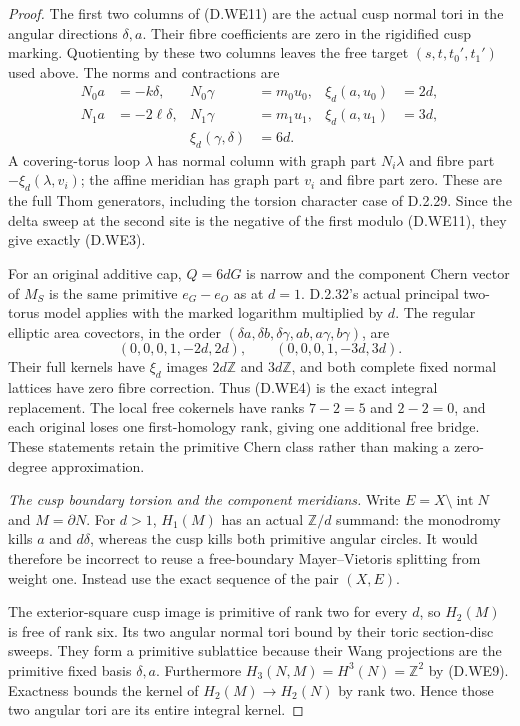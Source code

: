 \begin{proof}
The first two columns of (D.WE11) are the actual
cusp normal tori in the angular directions
$\delta,a$. Their fibre coefficients are zero in
the rigidified cusp marking. Quotienting by these
two columns leaves the free target
$(s,t,t_0',t_1')$ used above.
The norms and contractions are
\[
\begin{aligned}
 N_0a&=-k\delta,&N_0\gamma&=m_0u_0,&
 \xi_d(a,u_0)&=2d,\\
 N_1a&=-2\ell\delta,&N_1\gamma&=m_1u_1,&
 \xi_d(a,u_1)&=3d,\\
 &&\xi_d(\gamma,\delta)&=6d .
\end{aligned}
\]
A covering-torus loop $\lambda$ has normal column
with graph part $N_i\lambda$ and fibre part
$-\xi_d(\lambda,v_i)$; the affine meridian has
graph part $v_i$ and fibre part zero. These are the
full Thom generators, including the torsion
character case of D.2.29. Since the delta sweep
at the second site is the negative of the first
modulo (D.WE11), they give exactly (D.WE3).

For an original additive cap, $Q=6dG$ is narrow and
the component Chern vector of $M_S$ is the same
primitive $e_G-e_O$ as at $d=1$. D.2.32's actual
principal two-torus model applies with the marked
logarithm multiplied by $d$. The regular elliptic
area covectors, in the order
$(\delta a,\delta b,\delta\gamma,ab,a\gamma,b\gamma)$,
are
\[
 (0,0,0,1,-2d,2d),\qquad
 (0,0,0,1,-3d,3d).
\]
Their full kernels have $\xi_d$ images $2d\mathbb Z$
and $3d\mathbb Z$, and both complete fixed normal
lattices have zero fibre correction. Thus (D.WE4)
is the exact integral replacement. The local free
cokernels have ranks $7-2=5$ and $2-2=0$, and each
original loses one first-homology rank, giving
one additional free bridge. These statements retain
the primitive Chern class rather than making a
zero-degree approximation.

\emph{The cusp boundary torsion and the component meridians.}
Write $E=X\setminus\operatorname{int}N$ and $M=\partial N$.
For $d>1$, $H_1(M)$ has an actual $\mathbb Z/d$ summand:
the monodromy kills $a$ and $d\delta$, whereas the
cusp kills both primitive angular circles. It would
therefore be incorrect to reuse a free-boundary
Mayer--Vietoris splitting from weight one.
Instead use the exact sequence of the pair $(X,E)$.

The exterior-square cusp image is primitive of rank
two for every $d$, so $H_2(M)$ is free of rank six.
Its two angular normal tori bound by their toric
section-disc sweeps. They form a primitive sublattice
because their Wang projections are the primitive
fixed basis $\delta,a$.
Furthermore
$H_3(N,M)=H^3(N)=\mathbb Z^2$ by (D.WE9).
Exactness bounds the kernel of
$H_2(M)\to H_2(N)$ by rank two. Hence those two
angular tori are its entire integral kernel.


\end{proof}
